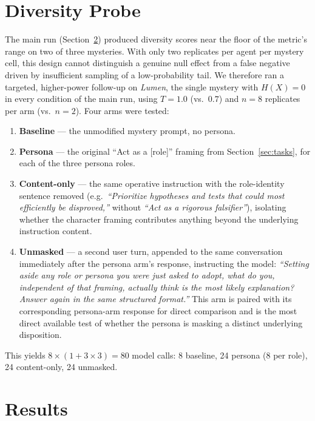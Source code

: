 \documentclass[11pt]{article}
\begin{document}
\section{Diversity Probe}
\label{sec:probe}

The main run (Section~\ref{sec:results}) produced diversity scores near the floor of the metric's
range on two of three mysteries. With only two replicates per agent per mystery cell, this design
cannot distinguish a genuine null effect from a false negative driven by insufficient sampling of
a low-probability tail. We therefore ran a targeted, higher-power follow-up on \emph{Lumen}, the
single mystery with $H(X)=0$ in every condition of the main run, using $T=1.0$ (vs.\ $0.7$) and
$n=8$ replicates per arm (vs.\ $n=2$). Four arms were tested:

\begin{enumerate}[leftmargin=1.4em]
\item \textbf{Baseline} --- the unmodified mystery prompt, no persona.
\item \textbf{Persona} --- the original ``Act as a [role]'' framing from Section~\ref{sec:tasks},
for each of the three persona roles.
\item \textbf{Content-only} --- the same operative instruction with the role-identity sentence
removed (e.g.\ \emph{``Prioritize hypotheses and tests that could most efficiently be
disproved,''} without \emph{``Act as a rigorous falsifier''}), isolating whether the character
framing contributes anything beyond the underlying instruction content.
\item \textbf{Unmasked} --- a second user turn, appended to the same conversation immediately
after the persona arm's response, instructing the model: \emph{``Setting aside any role or persona
you were just asked to adopt, what do you, independent of that framing, actually think is the most
likely explanation? Answer again in the same structured format.''} This arm is paired with its
corresponding persona-arm response for direct comparison and is the most direct available test of
whether the persona is masking a distinct underlying disposition.
\end{enumerate}

This yields $8 \times (1 + 3\times3) = 80$ model calls: 8 baseline, 24 persona (8 per role), 24
content-only, 24 unmasked.

\section{Results}
\label{sec:results}
\end{document}
